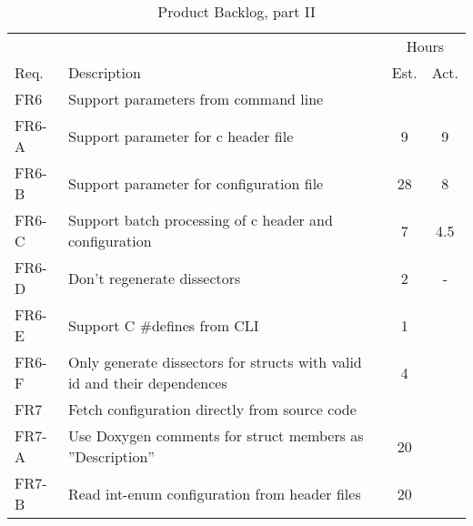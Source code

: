 \begin{table}[ht] \small \center
\caption{Product Backlog, part II \label{tab:prodbacklog2}}
\begin{tabularx}{\textwidth}{l X c c}
	\toprule
	& & \multicolumn{2}{c}{Hours} \\
	\cmidrule(r){3-4}
	Req. & Description & Est. & Act. \\
	\midrule	
	FR6 & Support parameters from command line & & \\
	FR6-A & Support parameter for \Gls{c} \gls{header} file & 9 & 9 \\
	FR6-B & Support parameter for configuration file & 28 & 8 \\
	FR6-C & Support batch processing of \Gls{c} \gls{header} and configuration & 7 & 4.5 \\
	FR6-D & Don't regenerate \glspl{dissector} & 2 & - \\
	FR6-E & Support C \#defines from CLI & 1 & \\
	FR6-F & Only generate dissectors for structs with valid id and their dependences & 4 & \\
    \addlinespace
	FR7 & Fetch configuration directly from source code & & \\
	FR7-A & Use Doxygen comments for struct members as ''Description'' & 20 & \\
	FR7-B & Read int-enum configuration from header files & 20 & \\
	\bottomrule
\end{tabularx}
\end{table}








